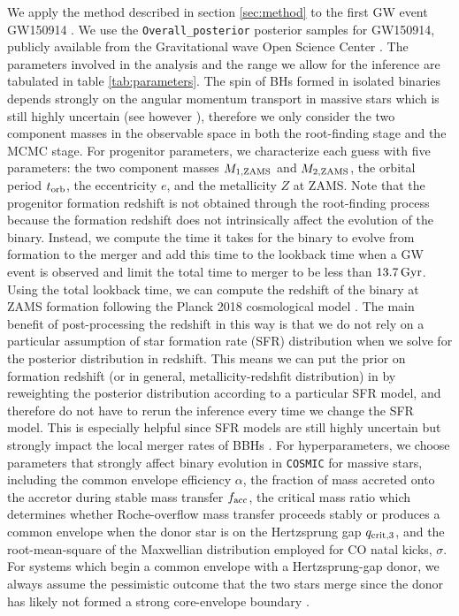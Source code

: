 \documentclass[twocolumn]{aastex631}
\begin{document}
We apply the method described in section \ref{sec:method} to the first GW event GW150914 \citep{GW150914}.
We use the \texttt{Overall\_posterior} posterior samples for GW150914,
publicly available from the Gravitational wave Open Science Center \citep{LIGOScientific:2019lzm}. 
The parameters involved in the analysis and the range we allow for the inference are tabulated in table \ref{tab:parameters}.
The spin of BHs formed in isolated binaries depends strongly on the angular
momentum transport in massive stars which is still highly uncertain (see however \citet{Fuller2019, Bavera2020}),
therefore we only consider the two component masses in the observable space in both the
root-finding stage and the MCMC stage. For progenitor parameters, we characterize each guess with
five parameters: the two component masses $M_{\rm 1,ZAMS}$ and $M_{\rm 2,ZAMS}$, the orbital period $t_{\rm orb}$,
the eccentricity $e$, and the metallicity $Z$ at ZAMS. Note that the progenitor formation redshift is not
obtained through the root-finding process because the formation redshift does not intrinsically affect
the evolution of the binary. Instead, we compute the time it takes for the binary to evolve from
formation to the merger and add this time to the lookback time when a GW event is observed and limit the total
time to merger to be less than $13.7\,\rm{Gyr}$.
Using the total lookback time, we can compute the redshift of the binary at ZAMS formation following the
Planck 2018 cosmological model \citep{Planck2018}.
The main benefit of post-processing the redshift in this way is that we do not rely on a particular assumption
of star formation rate (SFR) distribution when we solve for the posterior distribution in redshift.
This means we can put the prior on formation redshift (or in general, metallicity-redshfit distribution) in
by reweighting the posterior distribution according to a particular SFR model,
and therefore do not have to rerun the inference every time we change the SFR model. This is especially helpful
since SFR models are still highly uncertain but strongly impact the local merger rates of BBHs \citep[e.g. ][]{Broekgaarden2021}.
For hyperparameters, we choose parameters that strongly affect
binary evolution in \texttt{COSMIC} for massive stars, including the common envelope
efficiency $\alpha$, the fraction of mass accreted onto the accretor during stable mass transfer $f_{\rm acc}$,
the critical mass ratio which determines whether Roche-overflow mass transfer
proceeds stably or produces a common envelope when the donor star is on the Hertzsprung gap
$q_{\rm crit,3}$, and the root-mean-square of the Maxwellian distribution
employed for CO natal kicks, $\sigma$. For systems which begin a common envelope 
with a Hertzsprung-gap donor, we always assume the pessimistic outcome that the two 
stars merge since the donor has likely not formed a strong core-envelope boundary 
\citep{Ivanova2004, Belczynski2008}.
\end{document}
